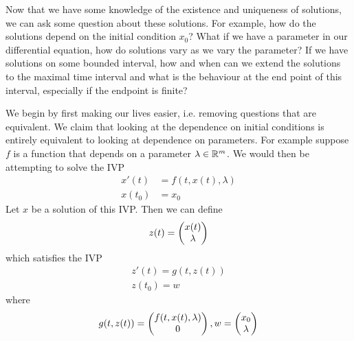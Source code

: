 Now that we have some knowledge of the existence and uniqueness of solutions, we can ask some question about these solutions. For example, how do the solutions depend on the initial condition $x_0$? What if we have a parameter in our differential equation, how do solutions vary as we vary the parameter? If we have solutions on some bounded interval, how and when can we extend the solutions to the maximal time interval and what is the behaviour at the end point of this interval, especially if the endpoint is finite?

We begin by first making our lives easier, i.e. removing questions that are equivalent. We claim that looking at the dependence on initial conditions is entirely equivalent to looking at dependence on parameters. For example suppose $f$ is a function that depends on a parameter $\lambda \in \mathbb{R}^m$. We would then be attempting to solve the IVP
\begin{align*}
    x'(t) &= f(t, x(t), \lambda)\\
    x(t_0) &= x_0
\end{align*}
Let $x$ be a solution of this IVP.
Then we can define
$$ z(t) = \begin{pmatrix} x(t) \\ \lambda \end{pmatrix} $$
which satisfies the IVP
\begin{align*}
    z'(t) = g(t, z(t))\\
    z(t_0) = w
\end{align*}
where
\begin{align*}
    g(t, z(t)) = \begin{pmatrix} f(t, x(t), \lambda)\\0 \end{pmatrix}, w = \begin{pmatrix} x_0 \\ \lambda \end{pmatrix}
\end{align*}